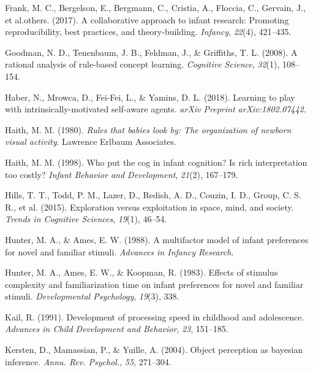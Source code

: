 \documentclass[10pt, letterpaper]{article}
\newenvironment{CSLReferences}%
  {}%
  {\par}
\begin{document}
\begin{CSLReferences}{1}{0}
\leavevmode{}%
Frank, M. C., Bergelson, E., Bergmann, C., Cristia, A., Floccia, C.,
Gervain, J., et al.others. (2017). A collaborative approach to infant
research: Promoting reproducibility, best practices, and
theory-building. \emph{Infancy}, \emph{22}(4), 421--435.

\leavevmode{}%
Goodman, N. D., Tenenbaum, J. B., Feldman, J., \& Griffiths, T. L.
(2008). A rational analysis of rule-based concept learning.
\emph{Cognitive Science}, \emph{32}(1), 108--154.

\leavevmode{}%
Haber, N., Mrowca, D., Fei-Fei, L., \& Yamins, D. L. (2018). Learning to
play with intrinsically-motivated self-aware agents. \emph{arXiv
Preprint arXiv:1802.07442}.

\leavevmode{}%
Haith, M. M. (1980). \emph{Rules that babies look by: The organization
of newborn visual activity}. Lawrence Erlbaum Associates.

\leavevmode{}%
Haith, M. M. (1998). Who put the cog in infant cognition? Is rich
interpretation too costly? \emph{Infant Behavior and Development},
\emph{21}(2), 167--179.

\leavevmode{}%
Hills, T. T., Todd, P. M., Lazer, D., Redish, A. D., Couzin, I. D.,
Group, C. S. R., et al. (2015). Exploration versus exploitation in
space, mind, and society. \emph{Trends in Cognitive Sciences},
\emph{19}(1), 46--54.

\leavevmode{}%
Hunter, M. A., \& Ames, E. W. (1988). A multifactor model of infant
preferences for novel and familiar stimuli. \emph{Advances in Infancy
Research}.

\leavevmode{}%
Hunter, M. A., Ames, E. W., \& Koopman, R. (1983). Effects of stimulus
complexity and familiarization time on infant preferences for novel and
familiar stimuli. \emph{Developmental Psychology}, \emph{19}(3), 338.

\leavevmode{}%
Kail, R. (1991). Development of processing speed in childhood and
adolescence. \emph{Advances in Child Development and Behavior},
\emph{23}, 151--185.

\leavevmode{}%
Kersten, D., Mamassian, P., \& Yuille, A. (2004). Object perception as
bayesian inference. \emph{Annu. Rev. Psychol.}, \emph{55}, 271--304.


\end{CSLReferences}
\end{document}
